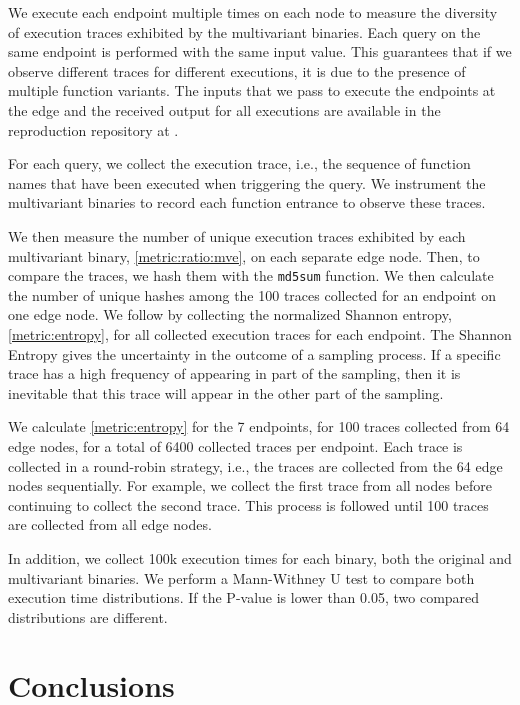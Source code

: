 We execute each endpoint multiple times on each node to measure the diversity of execution traces exhibited by the multivariant binaries. Each query on the same endpoint is performed with the same input value. This guarantees that if we observe different traces for different executions, it is due to the presence of multiple function variants. 
The inputs that we pass to execute the endpoints at the edge and the received output for all executions are available in the reproduction repository at . 

For each query, we collect the execution trace, i.e.,  the sequence of function names that have been executed when triggering the query.
We instrument the multivariant binaries to record each function entrance to observe these traces.

We then measure the number of unique execution traces exhibited by each multivariant binary, \autoref{metric:ratio:mve}, on each separate edge node. Then, to compare the traces, we hash them with the \texttt{md5sum} function.
We then calculate the number of unique hashes among the 100 traces collected for an endpoint on one edge node.
We follow by collecting the normalized Shannon entropy, \autoref{metric:entropy}, for all collected execution traces for each endpoint.
The Shannon Entropy gives the uncertainty in the outcome of a sampling process.
If a specific trace has a high frequency of appearing in part of the sampling, then it is inevitable that this trace will appear in the other part of the sampling.


We calculate \autoref{metric:entropy} for the 7 endpoints, for 100 traces collected from 64 edge nodes, for a total of 6400 collected traces per endpoint.
Each trace is collected in a round-robin strategy, i.e., the traces are collected from the 64 edge nodes sequentially.
For example, we collect the first trace from all nodes before continuing to collect the second trace.
This process is followed until 100 traces are collected from all edge nodes.


In addition, we collect 100k execution times for each binary, both the original and multivariant binaries.
We perform a Mann-Withney U test \cite{mann1947} to compare both execution time distributions. 
If the P-value is lower than 0.05, two compared distributions are different.


\section{Conclusions}


